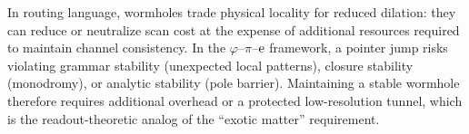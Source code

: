 In routing language, wormholes trade physical locality for reduced dilation: they can reduce or neutralize scan cost at the expense of additional resources required to maintain channel consistency.
In the $\varphi$--$\pi$--$\mathrm{e}$ framework, a pointer jump risks violating grammar stability (unexpected local patterns), closure stability (monodromy), or analytic stability (pole barrier).
Maintaining a stable wormhole therefore requires additional overhead or a protected low-resolution tunnel, which is the readout-theoretic analog of the ``exotic matter'' requirement.



